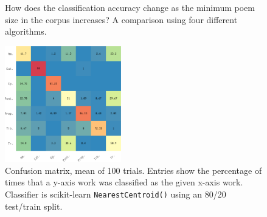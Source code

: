 \documentclass[twocolumn, switch, a4paper]{article} %
\begin{document}
\begin{figure}
  \caption{How does the classification accuracy change as the minimum poem
  size in the corpus increases? A comparison using four different algorithms.}
  \label{fig:poetics_acc}
  \centering
  \qquad
\end{figure}

\begin{figure}
\caption{
Confusion matrix, mean of 100 trials. Entries show the percentage of times
that a y-axis work was classified as the given x-axis work. Classifier is
scikit-learn \texttt{NearestCentroid()} using an 80/20 test/train split.}
\label{fig:cm_poetics}
\includegraphics[width=0.45\textwidth]{figures/cm_poetics-crop.pdf}
\end{figure}
\end{document}
